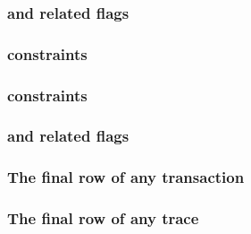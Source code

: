 \subsubsection{\transactionStart{} and related flags}    \label{hub: system: transactions: start}                          
\subsubsection{\transactionNumber{} constraints}         \label{hub: system: transactions: numbers}                        
\subsubsection{\totalTransactionNumber{} constraints}    \label{hub: system: transactions: total transaction number}       
\subsubsection{\transactionEnd{} and related flags}      \label{hub: system: transactions: end}                            
\subsubsection{The final row of any transaction}         \label{hub: system: transactions: final row of any transaction}   
\subsubsection{The final row of any trace}               \label{hub: system: transactions: finalization}                   
